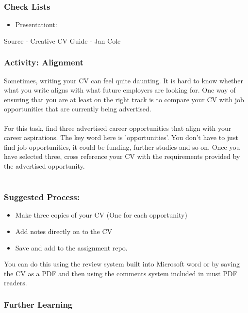 \begin{frame}
	\frametitle{Check Lists}
	\begin{itemize}
		\item Presentationt:
	\end{itemize}
	Source - Creative CV Guide - Jan Cole
\end{frame}

\begin{frame}
	\frametitle{Activity: Alignment}
	\small{
Sometimes, writing your CV can feel quite daunting. It is hard to know whether what you write aligns with what future employers are looking for. One way of ensuring that you are at least on the right track is to compare your CV with job opportunities that are currently being advertised. \\~\\
For this task, find three advertised career opportunities that align with your career aspirations. The key word here is 'opportunities'. You don't have to just find job opportunities, it could be funding, further studies and so on. Once you have selected three, cross reference your CV with the requirements provided by the advertised opportunity.  \\~\\
 } 
\end{frame}
	
\begin{frame}
	\frametitle{Suggested Process: }
	\begin{itemize}
		\item Make three copies of your CV (One for each opportunity)
		\item Add notes directly on to the CV 
		\item Save and add to the assignment repo.
	\end{itemize}

You can do this using the review system built into Microsoft word or by saving the CV as a PDF and then using the comments system included in must PDF readers.	

\end{frame}


\begin{frame}
	\frametitle{Further Learning}
\end{frame}



